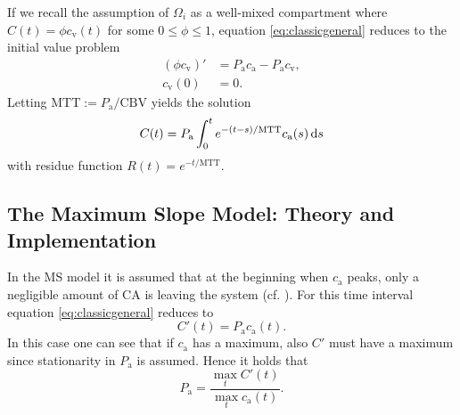 \documentclass[paper=a4, fontsize=11pt,parskip=half,headings=small]{scrartcl}
\newcommand{\ca}{c_\mathrm{a}}
\newcommand{\CBV}{\mathrm{CBV}}
\newcommand{\MTT}{\mathrm{MTT}}
\newcommand{\cout}{c_{\mathrm{v}}}
\newcommand{\Pa}{P_{\mathrm{a}}}
\begin{document}
	If we recall the assumption of $\Omega_i$ as a well-mixed compartment where $C(t) = \phi\cout(t)$ for some $0 \le \phi \le 1$, equation \eqref{eq:classicgeneral} reduces to the initial value problem
	\begin{align*}
		(\phi \cout)' &= \Pa \ca - \Pa \cout, \\
		\cout(0)&=0.
	\end{align*}
	Letting $\MTT:=\Pa/\CBV$ yields the solution
	\begin{equation}
		C(t) = \Pa \int_0^t e^{-(t-s)/\MTT}\ca(s)\diffint s
		\label{eq:classicalperf}
	\end{equation}
	with residue function $R(t)=e^{-t/\MTT}$. 

	
	
	
	\subsection{The Maximum Slope Model: Theory and Implementation}\label{sec:ms}	
	In the MS model it is assumed that at the beginning when $\ca$ peaks, only a negligible amount of CA is leaving the system (cf. \cite{klotz99}).
	For this time interval equation \eqref{eq:classicgeneral} reduces to 
	\begin{equation}
		C'(t) = \Pa\ca(t).
	\end{equation}
	In this case one can see that if $\ca$ has a maximum, also $C'$ must have a maximum since stationarity in $\Pa$ is assumed.
	Hence it holds that
	\begin{equation}\label{eq:MS}
		\Pa = \frac{\max_{t}C'(t)}{\max_{t}\ca(t)}.
	\end{equation}
	
	
	
\end{document}

